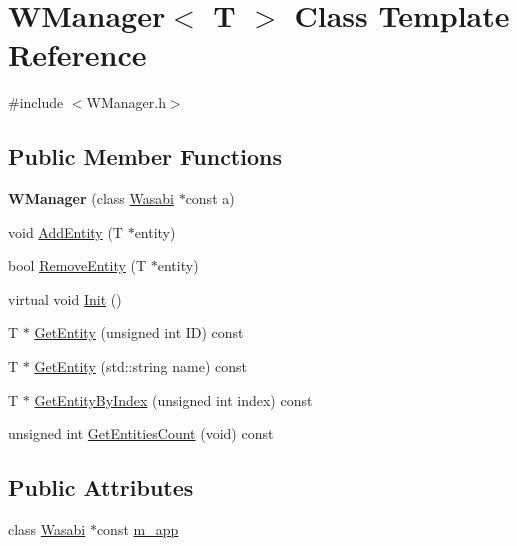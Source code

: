 \hypertarget{class_w_manager}{}\section{W\+Manager$<$ T $>$ Class Template Reference}
\label{class_w_manager}


{\ttfamily \#include $<$W\+Manager.\+h$>$}

\subsection*{Public Member Functions}
\begin{DoxyCompactItemize}
\item 
{\bfseries W\+Manager} (class \hyperlink{class_wasabi}{Wasabi} $\ast$const a)\hypertarget{class_w_manager_a664b28788a3733ff3119a528b7938137}{}\label{class_w_manager_a664b28788a3733ff3119a528b7938137}

\item 
void \hyperlink{class_w_manager_a9261664705e037ebe5e9c3701cd076f8}{Add\+Entity} (T $\ast$entity)
\item 
bool \hyperlink{class_w_manager_ab8cf0a65733d5347aa33bed8bc7e31d0}{Remove\+Entity} (T $\ast$entity)
\item 
virtual void \hyperlink{class_w_manager_ae20a5e3888b58881c60d0edcc0b30ff6}{Init} ()
\item 
T $\ast$ \hyperlink{class_w_manager_a0b5bee24b16f3a5e68aa34b1b530e699}{Get\+Entity} (unsigned int ID) const 
\item 
T $\ast$ \hyperlink{class_w_manager_a3d60263193f1e86b141cd49674756faf}{Get\+Entity} (std\+::string name) const 
\item 
T $\ast$ \hyperlink{class_w_manager_a02635cc3416f475cb6be4ba1861c4f12}{Get\+Entity\+By\+Index} (unsigned int index) const 
\item 
unsigned int \hyperlink{class_w_manager_ade73debf402ea3a0a04b4dfdc0360a91}{Get\+Entities\+Count} (void) const 
\end{DoxyCompactItemize}
\subsection*{Public Attributes}
\begin{DoxyCompactItemize}
\item 
class \hyperlink{class_wasabi}{Wasabi} $\ast$const \hyperlink{class_w_manager_ac25fc4a5d0ae81526d34b67ac7067915}{m\+\_\+app}
\end{DoxyCompactItemize}
